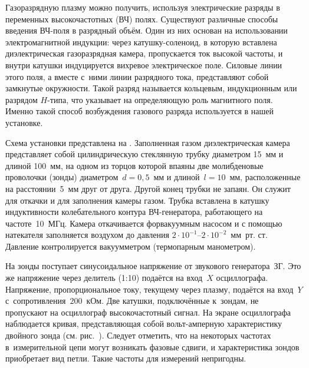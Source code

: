 


Газоразрядную плазму можно получить, используя электрические разряды в переменных высокочастотных (ВЧ) полях. Существуют
различные способы введения ВЧ-поля в разрядный объём. Один из них основан на использовании электромагнитной индукции:
через катушку-соленоид, в которую вставлена диэлектрическая газоразрядная камера, пропускается ток высокой частоты, и
внутри катушки индуцируется вихревое электрическое поле. Силовые линии этого поля, а вместе с~ними линии разрядного
тока, представляют собой замкнутые окружности. Такой разряд называется кольцевым, индукционным или разрядом $H$-типа,
что указывает на определяющую роль магнитного поля. Именно такой способ возбуждения газового разряда используется в нашей
установке.

\eo Схема установки представлена на . Заполненная газом диэлектрическая камера представляет собой цилиндрическую
стеклянную трубку диаметром 15~мм и длиной 100~мм, на одном из торцов которой впаяны две молибденовые проволочки (зонды)
диаметром~$d=0,5$~мм и длиной~$l=10$~мм, расположенные на расстоянии~5~мм друг от друга. Другой конец трубки не запаян.
Он служит для откачки и для заполнения камеры газом. Трубка вставлена в катушку индуктивности колебательного контура
ВЧ-генератора, работающего на частоте~10~МГц. Камера откачивается форвакуумным насосом и с помощью натекателя
заполняется воздухом до давления $2\cdot10^{-1}$--$2\cdot10^{-2}$~мм~рт. ст. Давление контролируется вакуумметром
(термопарным манометром).


На зонды поступает синусоидальное напряжение от звукового генератора~ЗГ. Это же напряжение через делитель (1:10)
подаётся на вход~$X$ осциллографа. Напряжение, пропорциональное току, текущему через плазму, подаётся на вход~$Y$
с~сопротивления~$200$~кОм. Две катушки, подключённые к~зондам, не пропускают на осциллограф высокочастотный сигнал. На
экране осциллографа наблюдается кривая, представляющая собой вольт-амперную характеристику двойного зонда (см.
рис.~). Следует отметить, что на некоторых частотах в~измерительной цепи могут возникать фазовые сдвиги, и
характеристика зондов приобретает вид петли. Такие частоты для измерений непригодны.

